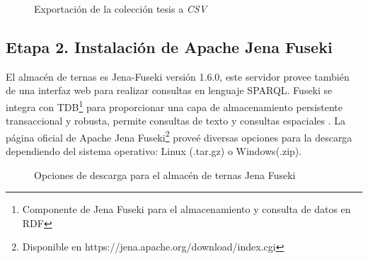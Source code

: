 \begin{figure}[!ht]
	\centering
    \caption{Exportaci\'on de la colecci\'on tesis a \textit{CSV}}
    \label{exportacion-csv}
\end{figure}

\subsection{Etapa 2. Instalaci\'on de Apache Jena Fuseki}

El almac\'en de ternas es Jena-Fuseki versi\'on 1.6.0, este servidor provee tambi\'en de una interfaz web para realizar consultas en lenguaje SPARQL. Fuseki se integra con TDB\footnote{Componente de Jena Fuseki para el almacenamiento y consulta de datos en RDF} para proporcionar una capa de almacenamiento persistente transaccional y robusta, permite consultas de texto y consultas espaciales \cite{JenaFuseki}. La p\'agina oficial de Apache Jena Fuseki\footnote{Disponible en https://jena.apache.org/download/index.cgi} prove\'e diversas opciones para la descarga dependiendo del sistema operativo: Linux (.tar.gz) o Windows(.zip). 

\begin{figure}[!ht]
	\centering
    \caption{Opciones de descarga para el almac\'en de ternas Jena Fuseki}
\label{opcionesDescargaFuseki}
\end{figure}

